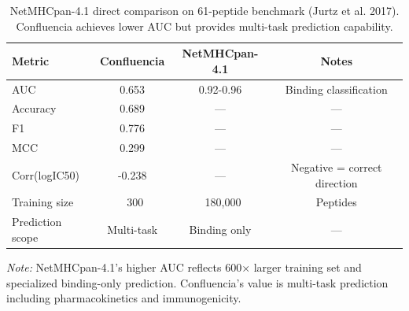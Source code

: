 \begin{table}[htbp]
\centering
\caption{NetMHCpan-4.1 direct comparison on 61-peptide benchmark (Jurtz et al. 2017). Confluencia achieves lower AUC but provides multi-task prediction capability.}
\label{tab:netmhcpan_compare}
\begin{tabular}{lccc}
\toprule
Metric & Confluencia & NetMHCpan-4.1 & Notes \\
\midrule
AUC & 0.653 & 0.92-0.96 & Binding classification \\
Accuracy & 0.689 & — & — \\
F1 & 0.776 & — & — \\
MCC & 0.299 & — & — \\
Corr(logIC50) & -0.238 & — & Negative = correct direction \\
Training size & ~300 & ~180,000 & Peptides \\
Prediction scope & Multi-task & Binding only & — \\
\bottomrule
\end{tabular}
\footnotesize {\textit{Note:} NetMHCpan-4.1's higher AUC reflects 600× larger training set and specialized binding-only prediction. Confluencia's value is multi-task prediction including pharmacokinetics and immunogenicity.}
\end{table}
